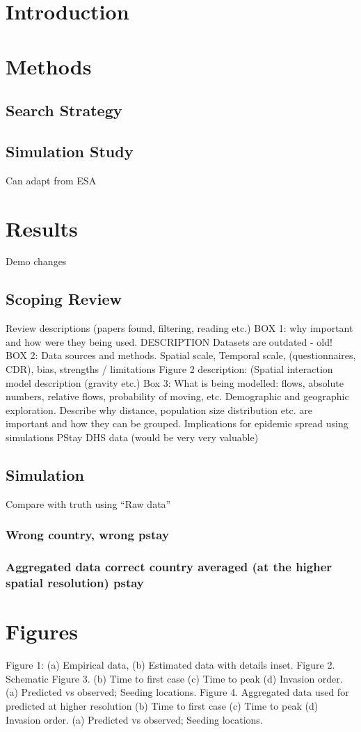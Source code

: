 \documentclass[a4paper,12pt]{article}
\begin{document}
\title{}
\author{}
\section{Introduction}
\section{Methods}
\subsection{Search Strategy}
\subsection{Simulation Study}
Can adapt from ESA
\section{Results}
Demo changes
\subsection{Scoping Review}
Review descriptions (papers found, filtering, reading etc.)
BOX 1: why important and how were they being used. DESCRIPTION
Datasets are outdated - old!
BOX 2: Data sources and methods. Spatial scale, Temporal scale, (questionnaires, CDR), bias, strengths / limitations
Figure 2 description: (Spatial interaction model description (gravity etc.)
Box 3: What is being modelled: flows, absolute numbers, relative flows, probability of moving, etc. 
Demographic and geographic exploration. Describe why distance, population size distribution etc. are important and how they can be grouped.
Implications for epidemic spread using simulations
PStay DHS data (would be very very valuable)
\subsection{Simulation}
Compare with truth using ``Raw data''
\subsubsection{Wrong country, wrong pstay}
\subsubsection{Aggregated data correct country averaged (at the higher spatial resolution) pstay}
\section{Figures}
Figure 1: (a) Empirical data, (b) Estimated data with details inset.
Figure 2. Schematic 
Figure 3. (b) Time to first case (c) Time to peak (d) Invasion order.
(a) Predicted vs observed; Seeding locations.
Figure 4. Aggregated data used for predicted at
higher resolution (b) Time to first case (c) Time to peak (d) Invasion order.
(a) Predicted vs observed; Seeding locations.
\end{document}

